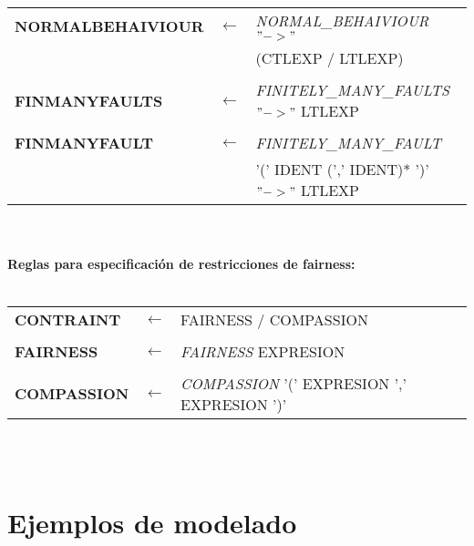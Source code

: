 \documentclass[titlepage, 12pt]{book}
\begin{document}
\noindent \begin{longtable}{>{\bfseries}lll}
NORMALBEHAIVIOUR & $\longleftarrow$ & \textit{NORMAL\_BEHAIVIOUR} $"->"$ \\
			     & & (CTLEXP / LTLEXP)\\\\
FINMANYFAULTS & $\longleftarrow$ & \textit{FINITELY\_MANY\_FAULTS} $"->"$ LTLEXP\\\\
FINMANYFAULT & $\longleftarrow$ & \textit{FINITELY\_MANY\_FAULT} \\ 
			 & & '(' IDENT (',' IDENT)* ')' $"->"$ LTLEXP\\
\end{longtable}
~\\\\





\textbf{Reglas para especificaci\'on de restricciones de fairness:}\\\\

\noindent \begin{longtable}{>{\bfseries}lll}
CONTRAINT & $\longleftarrow$ & FAIRNESS / COMPASSION\\\\
FAIRNESS & $\longleftarrow$ & \textit{FAIRNESS} EXPRESION\\\\
COMPASSION & $\longleftarrow$ & \textit{COMPASSION} '(' EXPRESION ',' EXPRESION ')'\\
\end{longtable}
~\\\\




\appendix
\appendixpage
\noappendicestocpagenum
\addappheadtotoc


\chapter{Ejemplos de modelado}
\label{ejemploModelado}
\end{document}

